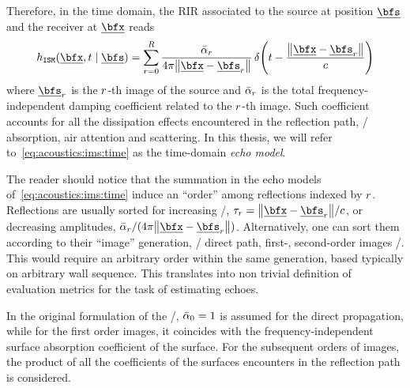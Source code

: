Therefore, in the time domain, the \ac{RIR} associated to the source at position $\positionSource$ and the receiver at $\positionMicrophone$ reads
\begin{equation}\label{eq:acoustics:ims:time}
    \rir_{\mathtt{ISM}}(\positionMicrophone, t \mid \positionSource) =
    \sum_{\idxEch=0}^{\numEchs}
        \frac{\bar{\absCoeff}_{\idxEch}}{4 \pi \norm{\positionMicrophone - \positionSource_\idxEch}}
        \diracOf{t - \frac{\norm{\positionMicrophone - \positionSource_\idxEch}}{\speedOfSound}}
\end{equation}
where $\positionSource_\idxEch$ is the $r$-th image of the source and $\bar{\alpha}_{r}$ is the total frequency-independent damping coefficient related to the $r$-th image.
Such coefficient accounts for all the dissipation effects encountered in the reflection path, \eg/ absorption, air attention and scattering.
In this thesis, we will refer to~\cref{eq:acoustics:ims:time} as the time-domain \textit{echo model}.

\mynewline
The reader should notice that the summation in the echo models of~\cref{eq:acoustics:ims:time} induce an ``order'' among reflections indexed by $r$.
Reflections are usually sorted for increasing \TOA/, $\tau_r = \norm{\positionMicrophone - \positionSource_\idxEch}/\speedOfSound$,
or decreasing amplitudes, $\bar{\absCoeff}_{\idxEch}/(4 \pi \norm{\positionMicrophone - \positionSource_\idxEch})$.
Alternatively, one can sort them according to their ``image'' generation, \eg/ direct path, first-, second-order images \etc/.
This would require an arbitrary order within the same generation, based typically on arbitrary wall sequence.
This translates into non trivial definition of evaluation metrics for the task of estimating echoes.

\mynewline
In the original formulation of the \ISM/, $\bar{\alpha}_{0} = 1$ is assumed for the direct propagation,
while for the first order images, it coincides with the frequency-independent surface absorption coefficient of the surface.
For the subsequent orders of images, the product of all the coefficients of the surfaces encounters in the reflection path is considered.

